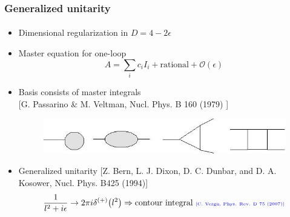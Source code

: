 \documentclass[english]{beamer}
\begin{document}
\begin{frame}[shrink=20]
\frametitle{Generalized unitarity}
\framesubtitle{}
\begin{itemize}
\item<1-> Dimensional regularization in $D = 4-2\epsilon$
\item<1-> Master equation for one-loop
\begin{equation*}
A = \sum_i c_i I_i + \mathrm{rational} + \mathcal{O}(\epsilon)
\end{equation*}
\item<2-> Basis consists of master integrals
\\
\tiny\color{blue}
[G. Passarino \& M. Veltman, Nucl. Phys. B 160 (1979)
]
\color{black}\normalsize

\begin{figure}[h]
  \centering
  \includegraphics[width=0.5\linewidth]{master_integrals.jpg}
\end{figure}

\item<3-> Generalized unitarity 
\tiny\color{blue}
[Z. Bern, L. J. Dixon, D. C. Dunbar, and D. A. Kosower, Nucl. Phys. B425 (1994)]
\color{black}\normalsize
\begin{equation*}
\frac{1}{l^2 + i\epsilon} \rightarrow 2\pi i\delta^{(+)}\big(l^2\big) \Rightarrow \textrm{contour integral \tiny\color{blue}[C. Vergu, Phys. Rev. D 75 (2007)]\color{black}\normalsize
}
\end{equation*}

\end{itemize}

\end{frame}
\end{document}
